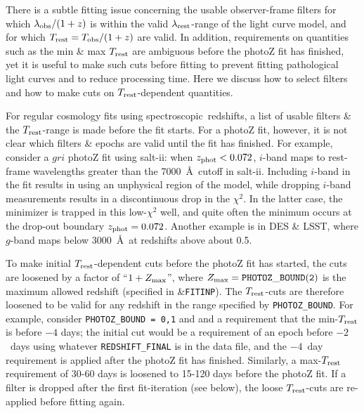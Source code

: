 \documentclass[12pt]{article}
\newcommand{\Tobs}{T_{\rm obs}}
\newcommand{\Trest}{T_{\rm rest}}
\newcommand{\SALTII}{{\sc salt-ii}}
\newcommand{\Zphot}{z_{\rm phot}}
\newcommand{\spec}{spectroscopic}
\newcommand{\lamobs}{\lambda_{\rm obs}}
\newcommand{\lamrest}{\lambda_{\rm rest}}
\newcommand{\zmax}{Z_{\rm max}}
\begin{document}
There is a subtle fitting issue concerning the usable
observer-frame filters for which $\lamobs/(1+z)$ is within 
the valid $\lamrest$-range of the light curve model,
and for which $\Trest = \Tobs/(1+z)$ are valid.
In addition, requirements on quantities such as
the min \& max $\Trest$ are ambiguous before the 
photoZ fit has finished, yet it is useful
to make such cuts before fitting to prevent fitting
pathological light curves and to reduce processing time. 
Here we discuss how to select filters and how to make cuts 
on $\Trest$-dependent quantities.


For regular cosmology fits using \spec\ redshifts,
a list of usable filters \& the $\Trest$-range 
is made before the fit starts. 
For a photoZ fit, however, it is not clear which filters \& epochs
are valid until the fit has finished. 
For example, consider a $gri$ photoZ fit using \SALTII: 
when $\Zphot < 0.072$, $i$-band maps to rest-frame wavelengths 
greater than the 7000~\AA\ cutoff in \SALTII. Including $i$-band
in the fit results in using an unphysical region of the model,
while dropping $i$-band measurements results in a discontinuous
drop in the $\chi^2$. In the latter case, the minimizer is trapped
in this low-$\chi^2$ well, and quite often the minimum occurs
at the drop-out boundary $\Zphot = 0.072$.
Another example is in DES \& LSST,
where $g$-band maps below 3000~\AA\
at redshifts above about 0.5.


To make initial $\Trest$-dependent cuts before the photoZ
fit has started, the cuts are loosened by a factor of
``$1+\zmax$'', where $\zmax= {\tt PHOTOZ\_BOUND(2)}$ is
the maximum allowed redshift (specified in \&{\tt FITINP}).
The $\Trest$-cuts are therefore loosened to be valid
for any redshift in the range specified by {\tt PHOTOZ\_BOUND}.
For example, consider {\tt PHOTOZ\_BOUND = 0,1} and 
and a requirement that the min-$\Trest$ is before $-4$ days;
the initial cut would be a requirement of an epoch before
$-2$~days using whatever {\tt REDSHIFT\_FINAL} is in the 
data file, and the $-4$~day requirement is applied after
the photoZ fit has finished.
Similarly, a max-$\Trest$ requirement of 30-60 days is loosened 
to 15-120 days before the photoZ fit.
If a filter is dropped after the first fit-iteration (see below), 
the loose $\Trest$-cuts are re-applied before fitting again.
\end{document}
